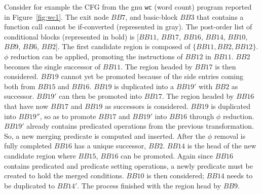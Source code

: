 Consider for example the CFG from the gnu \texttt{wc} (word count) program reported in Figure~\ref{fig:wc1}. The exit node $\textit{BB}7$, and basic-block $\textit{BB}3$ that contains a function call cannot be if-converted (represented in gray). 
 The post-order list of conditional blocks (represented in bold) is [$\textit{BB}11$, $\textit{BB}17$, $\textit{BB}16$, $\textit{BB}14$, $\textit{BB}10$, $\textit{BB}9$, $\textit{BB}6$, $\textit{BB}2$]. 
The first candidate region is composed of $\{\textit{BB11}, \textit{BB}2, \textit{BB}12\}$. $\phi$ reduction can be applied, promoting the instructions of $\textit{BB}12$ in $\textit{BB}11$. $\textit{BB}2$ becomes the single successor of $\textit{BB}11$. 
%
The region headed by $\textit{BB}17$ is then considered. $\textit{BB}19$ cannot yet be promoted because of the side entries coming both from $\textit{BB}15$ and $\textit{BB}16$. $\textit{BB}19$ is duplicated into a $\textit{BB}19'$ with $\textit{BB}2$ as successor. $\textit{BB}19'$ can then be promoted into $\textit{BB}17$.
%
The region headed by $\textit{BB}16$ that have now $\textit{BB}17$ and $\textit{BB}19$ as successors is considered. $\textit{BB}19$ is duplicated into $\textit{BB}19''$, so as to promote $\textit{BB}17$ and $\textit{BB}19'$ into $\textit{BB}16$ through $\phi$ reduction. $\textit{BB}19'$ already contains predicated operations from the previous transformation. So, a new merging predicate is computed and inserted. After the $\phi$ removal is fully completed $\textit{BB}16$ has a unique successor, $\textit{BB}2$.
%
$\textit{BB}14$ is the head of the new candidate region where $\textit{BB}15$, $\textit{BB}16$ can be promoted. Again since $\textit{BB}16$ contains predicated and predicate setting operations, a newly predicate must be created to hold the merged conditions.
$\textit{BB}10$ is then considered; $\textit{BB}14$ needs to be duplicated to $\textit{BB}14'$. The process finished with the region head by $\textit{BB}9$.

